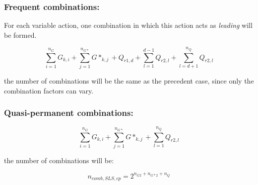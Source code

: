 \subsubsection{Frequent combinations:}\label{sc_comb_els_f}
For each variable action, one combination in which this action acts as \emph{leading} will be formed.

\begin{equation}
\sum_{i=1}^{n_G} G_{k,i} + \sum_{j=1}^{n_{G*}} G*_{k,j} + Q_{r1,d} + \sum_{l=1}^{d-1} Q_{r2,l} + \sum_{l=d+1}^{n_Q} Q_{r2,l} 
\end{equation}

the number of combinations will be the same as the precedent case, since only the combination factors can vary.

\subsubsection{Quasi-permanent combinations:}\label{sc_comb_els_cp}

\begin{equation}
\sum_{i=1}^{n_G} G_{k,i} + \sum_{j=1}^{n_{G*}} G*_{k,j} + \sum_{l=1}^{n_Q} Q_{r2,l} 
\end{equation}

the number of combinations will be:

\begin{equation} \label{eq_ncomb_els_cp}
n_{comb,SLS,cp}= 2^{n_{G2}+n_{G*2}+n_{Q}}
\end{equation}

